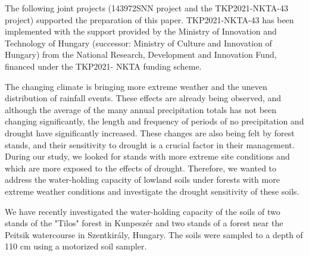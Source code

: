 The following joint projects (143972SNN project and the TKP2021-NKTA-43 project) supported the preparation of this paper. TKP2021-NKTA-43 has been implemented with the support provided by the Ministry of Innovation and Technology of Hungary (successor: Ministry of Culture and Innovation of Hungary) from the National Research, Development and Innovation Fund, financed under the TKP2021- NKTA funding scheme.
\newpage{}
{}
\begin{flushleft}





\end{flushleft}

\noindent

The changing climate is bringing more extreme weather and the uneven distribution of rainfall events. These effects are already being observed, and although the average of the many annual precipitation totals has not been changing significantly, the length and frequency of periods of no precipitation and drought have significantly increased. These changes are also being felt by forest stands, and their sensitivity to drought is a crucial factor in their management. During our study, we looked for stands with more extreme site conditions and which are more exposed to the effects of drought. Therefore, we wanted to address the water-holding capacity of lowland soils under forests with more extreme weather conditions and investigate the drought sensitivity of these soils.

We have recently investigated the water-holding capacity of the soils of two stands of the "Tilos" forest in Kunpeszér and two stands of a forest near the Peitsik watercourse in Szentkirály, Hungary. The soils were sampled to a depth of 110 cm using a motorized soil sampler.

